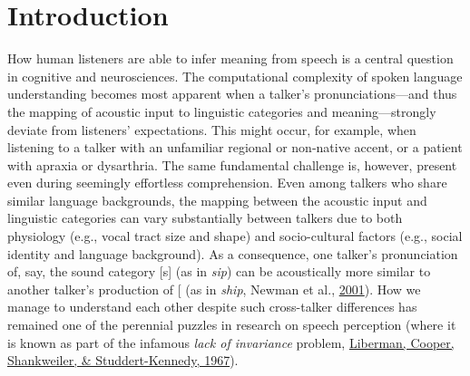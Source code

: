 \documentclass[
  11pt,
  english,
  man,floatsintext]{apa6}
\begin{document}
\newpage 
\setcounter{page}{1}

\hypertarget{introduction}{%
\section{Introduction}\label{introduction}}

How human listeners are able to infer meaning from speech is a central question in cognitive and neurosciences. The computational complexity of spoken language understanding becomes most apparent when a talker's pronunciations---and thus the mapping of acoustic input to linguistic categories and meaning---strongly deviate from listeners' expectations. This might occur, for example, when listening to a talker with an unfamiliar regional or non-native accent, or a patient with apraxia or dysarthria. The same fundamental challenge is, however, present even during seemingly effortless comprehension. Even among talkers who share similar language backgrounds, the mapping between the acoustic input and linguistic categories can vary substantially between talkers due to both physiology (e.g., vocal tract size and shape) and socio-cultural factors (e.g., social identity and language background). As a consequence, one talker's pronunciation of, say, the sound category {[}s{]} (as in \emph{sip}) can be acoustically more similar to another talker's production of {[}\ipatext{ʃ}{]} (as in \emph{ship}, Newman et al., \protect\hyperlink{ref-newman2001}{2001}). How we manage to understand each other despite such cross-talker differences has remained one of the perennial puzzles in research on speech perception (where it is known as part of the infamous \emph{lack of invariance} problem, \protect\hyperlink{ref-liberman1967}{Liberman, Cooper, Shankweiler, \& Studdert-Kennedy, 1967}).
\end{document}
